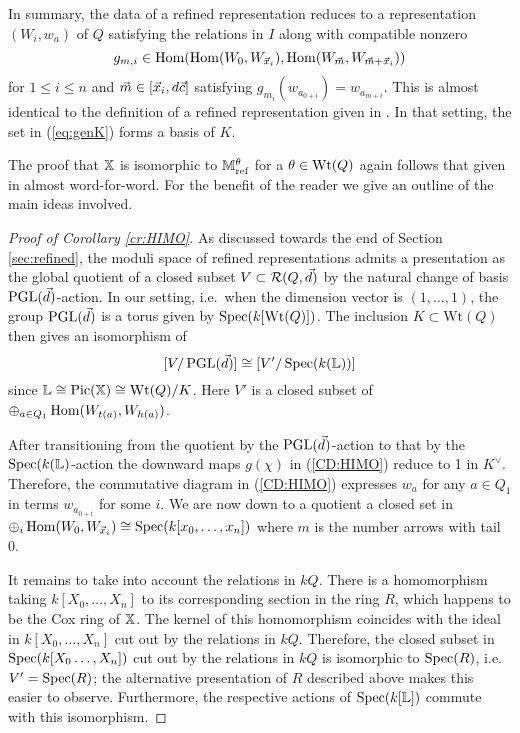 \documentclass[12pt]{amsart}
\newcommand{\Wt}{\textup{Wt}}
\begin{document}
In summary, the data of a refined representation reduces to a representation $(W_i, w_a)$ of $Q$ satisfying the relations in $I$ along with compatible nonzero $$g_{m,i} \in \operatorname{Hom}(\operatorname{Hom}(W_0, W_{{\vec{x}}_i}),\operatorname{Hom}(W_{{\vec{m}}},W_{{\vec{m}} + {\vec{x}}_i}))$$ for $1\leq i \leq n$ and ${\vec{m}} \in [{\vec{x}}_i, d{\vec{c}}]$ satisfying $g_{m_i}(w_{a_{0+i}}) = w_{a_{m+i}}$. This is almost identical to the definition of a refined representation given in \cite[Definition 3.1]{AU}. In that setting, the set in (\ref{eq:genK}) forms a basis of $K$.

The proof that $\mathbb{X}$ is isomorphic to $\mathbb{M}_{\text{ref}}^\theta$ for a $\theta \in \Wt(Q)$ again follows that given in \cite[Proof of Theorem 1.1]{AU} almost word-for-word. 
For the benefit of the reader we give an outline of the main ideas involved.

\begin{proof}[Proof of Corollary \ref{cr:HIMO}]
As discussed towards the end of Section \ref{sec:refined}, the moduli space of refined representations admits a presentation as the global quotient of a closed subset $V \subset \mathcal{R}(Q, \vec{d})$ by the natural change of basis $\operatorname{PGL}(\vec{d})$-action.
In our setting, i.e.\ when the dimension vector is $(1,\ldots,1)$, the group $\operatorname{PGL}(\vec{d})$ is a torus given by $\operatorname{Spec}(k[\text{Wt}(Q)])$. The inclusion $K \subset \text{Wt}(Q)$ then gives an isomorphism of \begin{equation}\label{eq:2gitquots}[V/\operatorname{PGL}(\vec{d})] \cong [V'/\operatorname{Spec}(k(\mathbb{L}))]\end{equation} since $\mathbb{L} \cong \operatorname{Pic}(\mathbb{X}) \cong \text{Wt}(Q)/K$. 
Here $V'$ is a closed subset of $\oplus_{a \in Q_1} \operatorname{Hom}(W_{t(a)}, W_{h(a)})$.

After transitioning from the quotient by the $\operatorname{PGL}(\vec{d})$-action to that by the $\operatorname{Spec}(k(\mathbb{L})$-action the downward maps $g(\chi)$ in (\ref{CD:HIMO}) reduce to 1 in $K^\vee$. 
Therefore, the commutative diagram in (\ref{CD:HIMO}) expresses $w_a$ for any $a \in Q_1$ in terms $w_{a_{0+i}}$ for some $i$. 
We are now down to a quotient a closed set in $\oplus_i \operatorname{Hom}(W_0, W_{{\vec{x}}_i}) \cong \operatorname{Spec}(k[x_0, \ldots, x_n])$ where $m$ is the number arrows with tail $0$. 

It remains to take into account the relations in $kQ$. 
There is a homomorphism taking $k[X_0, \ldots, X_n]$ to its corresponding section in the ring $R$, which happens to be the Cox ring of $\mathbb{X}$.
The kernel of this homomorphism coincides with the ideal in $k[X_0, \ldots, X_n]$ cut out by the relations in $kQ$. 
Therefore, the closed subset in $\operatorname{Spec}(k[X_0 \ldots, X_n])$ cut out by the relations in $kQ$ is isomorphic to $\operatorname{Spec}(R)$, i.e.\ $V' = \operatorname{Spec}(R)$; the alternative presentation of $R$ described above makes this easier to observe. Furthermore, the respective actions of $\operatorname{Spec}(k[\mathbb{L}])$ commute with this isomorphism.


\end{proof}
\end{document}
